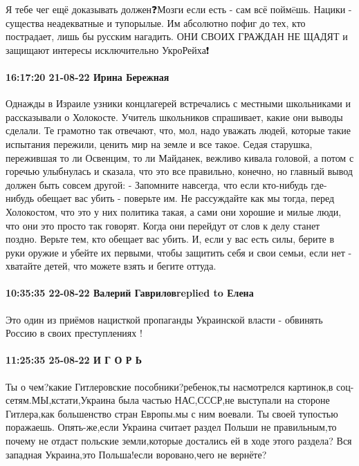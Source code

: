 Я тебе чег ещё доказывать должен❓Мозги если есть - сам всё поймëшь.
Нацики - существа неадекватные и тупорылые. Им абсолютно пофиг до тех, кто пострадает, лишь бы русским нагадить.
ОНИ СВОИХ ГРАЖДАН НЕ ЩАДЯТ и защищают интересы исключительно УкроРейха❗

\paragraph{16:17:20 21-08-22 Ирина Бережная}

Однажды в Израиле узники концлагерей встречались с местными школьниками и рассказывали о Холокосте.
Учитель школьников спрашивает, какие они выводы сделали. Те грамотно так отвечают, что, мол, надо уважать людей, которые такие испытания пережили, ценить мир на земле и все такое.
Седая старушка, пережившая то ли Освенцим, то ли Майданек, вежливо кивала головой, а потом с горечью улыбнулась и сказала, что это все правильно, конечно, но главный вывод должен быть совсем другой:
- Запомните навсегда, что если кто-нибудь где-нибудь обещает вас убить - поверьте им. Не рассуждайте как мы тогда, перед Холокостом, что это у них политика такая, а сами они хорошие и милые люди, что они это просто так говорят. Когда они перейдут от слов к делу станет поздно. Верьте тем, кто обещает вас убить. И, если у вас есть силы, берите в руки оружие и убейте их первыми, чтобы защитить себя и свои семьи, если нет - хватайте детей, что можете взять и бегите оттуда.

\paragraph{10:35:35 22-08-22 Валерий Гавриловreplied to Елена}

Это один из приёмов нацисткой пропаганды Украинской власти - обвинять Россию в
своих преступлениях !

\paragraph{11:25:35 25-08-22 И Г О Р Ь}

Ты о чем?какие Гитлеровские пособники?ребенок,ты насмотрелся картинок,в
соц-сетям.МЫ,кстати,Украина была частью НАС,СССР,не выступали на стороне
Гитлера,как большенство стран Европы.мы с ним воевали. Ты своей тупостью
поражаешь. Опять-же,если Украина считает раздел Польши не правильным,то почему
не отдаст польские земли,которые достались ей в ходе этого раздела? Вся
западная Украина,это Польша!если воровано,чего не вернёте?
